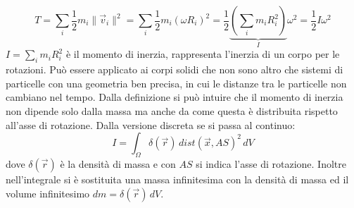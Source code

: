 \documentclass[10pt]{article}
\theoremstyle{plain}
\theoremstyle{definition}
\begin{document}
$$T=\sum_i \frac{1}{2}m_i\lVert\vec{v}_i\rVert^2 = \sum_i \frac{1}{2}m_i(\omega R_i)^2 = \frac{1}{2} \underbrace{\left( \sum_i m_i R_i^2\right)}_{I}\omega^2 = \frac{1}{2} I \omega^2$$
$I=\sum_i m_i R_i^2$ è il momento di inerzia, rappresenta l'inerzia di un corpo per le rotazioni. Può essere applicato ai corpi solidi che non sono altro che sistemi di particelle con una geometria ben precisa, in cui le distanze tra le particelle non cambiano nel tempo. Dalla definizione si può intuire che il momento di inerzia non dipende solo dalla massa ma anche da come questa è distribuita rispetto all'asse di rotazione. Dalla versione discreta se si passa al continuo:
$$I=\int_{\Omega} \delta(\vec{r})\, dist(\vec{x},AS)^2 \,dV$$
dove $\delta(\vec{r})$ è la densità di massa e con $AS$ si indica l'asse di rotazione. Inoltre nell'integrale si è sostituita una massa infinitesima con la densità di massa ed il volume infinitesimo $dm = \delta(\vec{r}) \,dV$.
\end{document}
